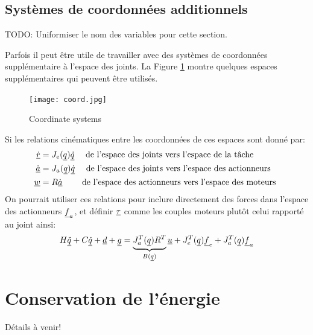 \subsection{Systèmes de coordonnées additionnels}
\label{sec:coord}

TODO: Uniformiser le nom des variables pour cette section.

Parfois il peut être utile de travailler avec des systèmes de coordonnées supplémentaire à l'espace des joints. La Figure \ref{fig:coord} montre quelques espaces supplémentaires qui peuvent être utilisés. 
%
\begin{figure}[H]
	\centering
		\texttt{[image: coord.jpg]}
	\caption{Coordinate systems}%
	\label{fig:coord}
\end{figure}
%
Si les relations cinématiques entre les coordonnées de ces espaces sont donné par:
%
\begin{align}
\underline{\dot{r}}   &= J_e( \underline{q} ) \underline{\dot{q} }  \quad \text{ de l'espace des joints vers l'espace de la tâche   } \\
\underline{\dot{a}}   &= J_a( \underline{q} ) \underline{\dot{q} }  \quad \text{ de l'espace des joints vers l'espace des actionneurs } \\
\underline{w }        &= R              \underline{\dot{a} }  \quad\quad \text{ de l'espace des actionneurs vers l'espace des moteurs } 
\label{eq:coord_transform2}
\end{align}
%
%
On pourrait utiliser ces relations pour inclure directement des forces dans l'espace des actionneurs $\underline{f}_a$, et définir $\underline{\tau}$ comme les couples moteurs plutôt celui rapporté au joint ainsi:
\begin{align}
H \underline{\ddot{q}} + C \underline{\dot{q}} + \underline{d} + \underline{g} =  \underbrace{ J_a^T(\underline{q}) R^T }_{B(\underline{q})}  \underline{u} + J_e^T(\underline{q}) \underline{f}_e + J_a^T(\underline{q}) \underline{f}_a
\label{eq:manipulator_gen}
\end{align}


\newpage
\section{Conservation de l'énergie}

Détails à venir!


